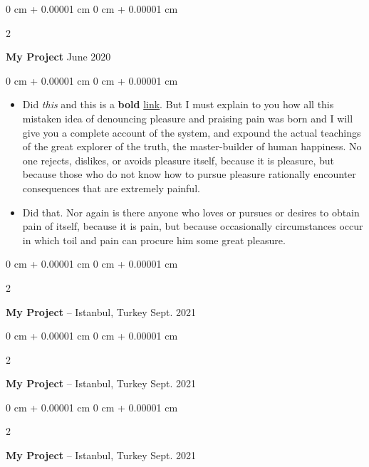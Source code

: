 \documentclass[10pt, letterpaper]{article}
\newenvironment{highlights}{
    \begin{itemize}[
        topsep=0.10 cm,
        parsep=0.10 cm,
        partopsep=0pt,
        itemsep=0pt,
        leftmargin=0 cm + 10pt
    ]
}{
    \end{itemize}
} %
\newenvironment{onecolentry}{
    \begin{adjustwidth}{
        0 cm + 0.00001 cm
    }{
        0 cm + 0.00001 cm
    }
}{
    \end{adjustwidth}
} %
\newenvironment{twocolentry}[2][]{
    \onecolentry
    \def\secondColumn{#2}
    \setcolumnwidth{\fill, 4.5 cm}
    \begin{paracol}{2}
}{
    \switchcolumn \raggedleft \secondColumn
    \end{paracol}
    \endonecolentry
} %
\begin{document}
        \vspace{0.2 cm}

        \begin{twocolentry}{
            June 2020
        }
            \textbf{My Project}\end{twocolentry}

        \vspace{0.10 cm}
        \begin{onecolentry}
            \begin{highlights}
                \item Did \textit{this} and this is a \textbf{bold} \href{https://example.com}{link}. But I must explain to you how all this mistaken idea of denouncing pleasure and praising pain was born and I will give you a complete account of the system, and expound the actual teachings of the great explorer of the truth, the master-builder of human happiness. No one rejects, dislikes, or avoids pleasure itself, because it is pleasure, but because those who do not know how to pursue pleasure rationally encounter consequences that are extremely painful.
                \item Did that. Nor again is there anyone who loves or pursues or desires to obtain pain of itself, because it is pain, but because occasionally circumstances occur in which toil and pain can procure him some great pleasure.
            \end{highlights}
        \end{onecolentry}


        \vspace{0.2 cm}

        \begin{twocolentry}{
            Sept. 2021
        }
            \textbf{My Project} -- Istanbul, Turkey\end{twocolentry}



        \vspace{0.2 cm}

        \begin{twocolentry}{
            Sept. 2021
        }
            \textbf{My Project} -- Istanbul, Turkey\end{twocolentry}



        \vspace{0.2 cm}

        \begin{twocolentry}{
            Sept. 2021
        }
            \textbf{My Project} -- Istanbul, Turkey\end{twocolentry}
\end{document}
